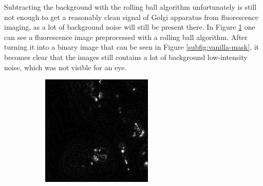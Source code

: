 Subtracting the background with the rolling ball algorithm unfortunately is still not enough to get a reasonably clean signal of Golgi apparatus from fluorescence imaging, as a lot of background noise will still be present there. In Figure \ref{subfig:vanilla} one can see a fluorescence image preprocessed with a rolling ball algorithm. After turning it into a binary image that can be seen in Figure \ref{subfig:vanilla-mask}, it becomes clear that the images still contains a lot of background low-intensity noise, which was not visible for an eye.
\begin{figure}[htb]
	\centering
	\begin{subfigure}[b]{0.22\textwidth}
		\centering
		\includegraphics[width=\textwidth]{bilder/preprocessing/crop_golgi_not_full_processed.png}
		\caption{}
		\label{subfig:vanilla}
	\end{subfigure}
	\hfill
	\begin{subfigure}[b]{0.22\textwidth}
		\centering

\end{subfigure}
\end{figure}
